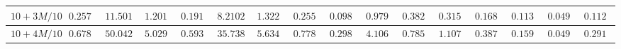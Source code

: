 \begin{table}[]
\begin{tabular}{|c|c|c|c|c|c|c|c|c|c|c|c|c|c|c|c}
$10 + 3M/10$ & $0.257800$                                                        & $11.501200$                                                       & $1.201100$                                                          & $0.191000$                                                           & $8.210200$                                                              & $1.322800$                                                        & $0.255400$                                                          & $0.098800$                                                           & $0.979900$                                                              & $0.382800$                                                        & $0.315200$                                                          & $0.168660$                                                        & $0.113480$                                                          & $0.049430$                                                           & \multicolumn{1}{c|}{$0.112420$}                                                              \\ \hline
$10 + 4M/10$ & $0.678200$                                                        & $50.042600$                                                       & $5.029500$                                                          & $0.593300$                                                           & $35.738500$                                                             & $5.634600$                                                        & $0.778800$                                                          & $0.298500$                                                           & $4.106900$                                                              & $0.785100$                                                        & $1.107000$                                                          & $0.387270$                                                        & $0.159590$                                                          & $0.049990$                                                           & \multicolumn{1}{c|}{$0.291300$}                                                              \\ \hline

\end{tabular}
\end{table}
